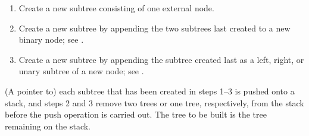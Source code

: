 \begin{enumerate}
\item Create a new subtree consisting of one external node.
\item Create a new subtree by appending the two subtrees last created 
      to a new binary node; see .
\item Create a new subtree by appending the subtree created last as a left,
      right, or unary subtree of a new node; see .
\end{enumerate}

(A pointer to) each subtree that has been
created in steps 1--3 is pushed onto a stack, and
steps 2 and 3 remove two trees or one tree, respectively,
from the stack before the push
operation is carried out. The tree to be built is
the tree remaining on the stack.


